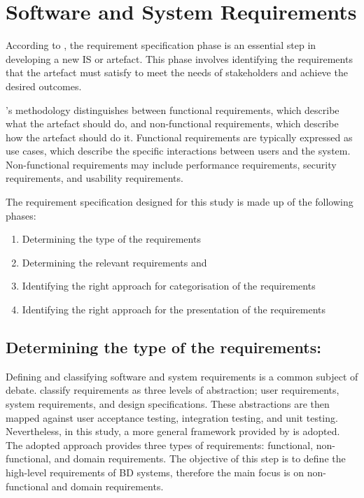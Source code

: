 \documentclass[journal]{IEEEtran}
\begin{document}
\section{Software and System Requirements}
\label{sec:software_and_system_requirements}

According to \cite{wieringa2014design}\cite{wieringa2014design}, the requirement specification phase is an essential step in developing a new IS or artefact. This phase involves identifying the requirements that the artefact must satisfy to meet the needs of stakeholders and achieve the desired outcomes.

\cite{wieringa2014design}'s methodology distinguishes between functional requirements, which describe what the artefact should do, and non-functional requirements, which describe how the artefact should do it. Functional requirements are typically expressed as use cases, which describe the specific interactions between users and the system. Non-functional requirements may include performance requirements, security requirements, and usability requirements.

The requirement specification designed for this study is made up of the following phases: 

\begin{enumerate}
    \item Determining the type of the requirements 
    \item Determining the relevant requirements and 
    \item Identifying the right approach for categorisation of the requirements 
    \item Identifying the right approach for the presentation of the requirements 
\end{enumerate}

\subsection{Determining the type of the requirements:}

Defining and classifying software and system requirements is a common subject of debate. \cite{sommerville2011software}\cite{sommerville2011software} classify requirements as three levels of abstraction; user requirements, system requirements, and design specifications. These abstractions are then mapped against user acceptance testing, integration testing, and unit testing. Nevertheless, in this study, a more general framework provided by \cite{laplante2017requirements} is adopted. The adopted approach provides three types of requirements: functional, non-functional, and domain requirements. The objective of this step is to define the high-level requirements of BD systems, therefore the main focus is on non-functional and domain requirements. 
\end{document}
